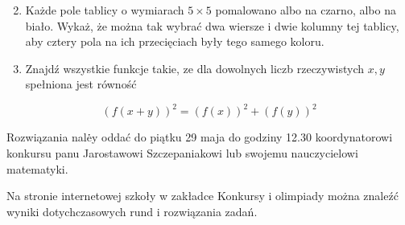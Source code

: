 \documentclass[10pt]{article}
\begin{document}
\begin{enumerate}
  \setcounter{enumi}{1}
  \item Każde pole tablicy o wymiarach \(5 \times 5\) pomalowano albo na czarno, albo na biało. Wykaż, że można tak wybrać dwa wiersze i dwie kolumny tej tablicy, aby cztery pola na ich przecięciach były tego samego koloru.
  \item Znajdź wszystkie funkcje takie, ze dla dowolnych liczb rzeczywistych \(x, y\) spełniona jest równość
\end{enumerate}

\[
(f(x+y))^{2}=(f(x))^{2}+(f(y))^{2}
\]

Rozwiązania nalė̇y oddać do piątku 29 maja do godziny 12.30 koordynatorowi konkursu panu Jarostawowi Szczepaniakowi lub swojemu nauczycielowi matematyki.

Na stronie internetowej szkoły w zakładce Konkursy i olimpiady można znaleźć wyniki dotychczasowych rund i rozwiązania zadań.
\end{document}
